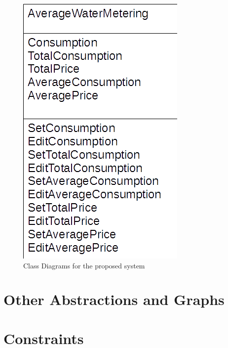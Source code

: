 \begin{figure}[H]
    \includegraphics[width=\textwidth]{./AverageWaterMetering.png}
    \caption{Class Diagrams for the proposed system} \label{fig:AverageWaterMetering Class Diagram}
\end{figure}
\section{Other Abstractions and Graphs}

\section{Constraints}

